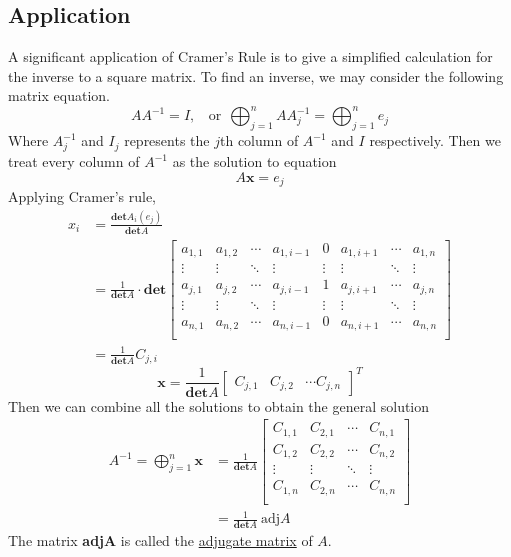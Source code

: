 \documentclass[11pt]{article}
\begin{document}
\subsection{Application}
A significant application of Cramer's Rule is to give a simplified calculation for the inverse to a square matrix. To find an inverse, we may consider the following matrix equation.
\begin{equation}
    AA^{-1} = I,~~~~\text{or}~~    \bigoplus_{j=1}^{n}AA^{-1}_{j} = \bigoplus_{j=1}^{n}e_{j}
\end{equation}
Where $A^{-1}_j$ and $I_{j}$ represents the $j$th column of $A^{-1}$ and $I$ respectively. Then we treat every column of $A^{-1}$ as the solution to equation
\begin{equation}
    A\bm{x} = e_j
\end{equation}
Applying Cramer's rule,
\begin{equation}
\begin{aligned}
    x_i &= \frac{\bm{det}A_i(e_j)}{\bm{det}A} \\
    &= \frac{1}{\bm{det}A} \cdot \bm{det}
    \begin{bmatrix}
    a_{1,1} & a_{1,2} & \cdots & a_{1,i-1} & 0 & a_{1,i+1} & \cdots & a_{1,n} \\
    \vdots & \vdots & \ddots & \vdots & \vdots & \vdots & \ddots & \vdots \\
    a_{j,1} & a_{j,2} & \cdots & a_{j,i-1} & 1 & a_{j,i+1} & \cdots & a_{j, n} \\
    \vdots & \vdots & \ddots & \vdots & \vdots & \vdots & \ddots & \vdots \\
    a_{n,1} & a_{n,2} & \cdots & a_{n,i-1} & 0 & a_{n,i+1} & \cdots & a_{n,n}\\
    \end{bmatrix} \\
    &= \frac{1}{\bm{det}A} C_{j,i}
\end{aligned}
\end{equation}
\begin{equation}
    \bm{x} = \frac{1}{\bm{det}A} \begin{bmatrix}
    C_{j,1} & C_{j,2} & \cdots C_{j,n}
    \end{bmatrix}^{T}
\end{equation}
Then we can combine all the solutions to obtain the general solution
\begin{equation}
\begin{aligned}
    A^{-1} = \bigoplus_{j=1}^{n} \bm{x} &= \frac{1}{\bm{det}A} \begin{bmatrix}
    C_{1,1} & C_{2,1} & \cdots & C_{n,1} \\
    C_{1,2} & C_{2,2} & \cdots & C_{n,2} \\
    \vdots & \vdots & \ddots & \vdots \\
    C_{1,n} & C_{2,n} & \cdots & C_{n,n} \\
    \end{bmatrix}
    \\ &= \frac{1}{\bm{det}A}~\text{adj}A
\end{aligned}
\end{equation}
The matrix \textbf{adj}$\bm{A}$ is called the \underline{adjugate matrix} of $A$.
\end{document}
